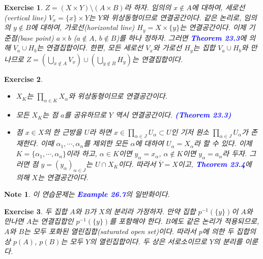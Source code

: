 \documentclass{article}
\newtheorem{exercise}{Exercise}[section]
\newtheorem*{note}{Note}
\begin{document}
\begin{exercise}
    $Z=(X\times Y)\setminus(A\times B)$라 하자. 임의의 $x\notin A$에 대하여, 세로선(vertical line) $V_x=\{x\}\times Y$는 $Y$와 위상동형이므로 연결공간이다. 같은 논리로, 임의의 $y\notin B$에 대하여, 가로선(horizontal line) $H_y=X\times \{y\}$는 연결공간이다. 이제 기준점(base point) $a\times b$ ($a\notin A$, $b\notin B$)를 하나 정하자. 그러면 \textcolor{blue}{\textbf{Theorem 23.3}}에 의해 $V_a\cup H_b$는 연결집합이다. 한편, 모든 세로선 $V_x$와 가로선 $H_y$는 집합 $V_a\cup H_b$와 만나므로 $Z=(\bigcup_{x\notin A}V_x)\cup(\bigcup_{y\notin B}H_y)$는 연결집합이다.
\end{exercise}

\begin{exercise}
	\label{exc:23.10}
    \phantom{}
    \begin{itemize}
        \item[(a)] $X_K$는 $\prod_{\alpha\in K}X_\alpha$와 위상동형이므로 연결공간이다.
        \item[(b)] 모든 $X_K$는 점 $a$를 공유하므로 $Y$ 역시 연결공간이다. \textcolor{blue}{\textbf{(Theorem 23.3)}}
        \item[(c)] 점 $x\in X$의 한 근방을 $U$라 하면 $x\in\prod_{\alpha\in J}U_\alpha\subset U$인 기저 원소 $\prod_{\alpha\in J}U_\alpha$가 존재한다. 이때 $\alpha_1,\cdots,\alpha_n$를 제외한 모든 $\alpha$에 대하여 $U_\alpha=X_\alpha$라 할 수 있다. 이제 $K=\{\alpha_1,\cdots,\alpha_n\}$이라 하고, $\alpha\in K$이면 $y_\alpha=x_\alpha$, $\alpha\notin K$이면 $y_\alpha=a_\alpha$라 두자. 그러면 점 $y=(y_\alpha)_{\alpha\in J}$는 $U\cap X_K$이다. 따라서 $\overline{Y}=X$이고, \textcolor{blue}{\textbf{Theorem 23.4}}에 의해 $X$는 연결공간이다.
    \end{itemize}
\end{exercise}
\begin{note}
    이 연습문제는 \textcolor{blue}{\textbf{Example 26.7}}의 일반화이다.
\end{note}

\begin{exercise}
    두 집합 $A$와 $B$가 $X$의 분리라 가정하자. 만약 집합 $p^{-1}(\{y\})$이 $A$와 만나면 $A$는 연결집합인 $p^{-1}(\{y\})$를 포함해야 한다. $B$에도 같은 논리가 적용되므로, $A$와 $B$는 모두 포화된 열린집합(saturated open set)이다. 따라서 $p$에 의한 두 집합의 상 $p(A)$, $p(B)$는 모두 $Y$의 열린집합이다. 두 상은 서로소이므로 $Y$의 분리를 이룬다. 
\end{exercise}
\end{document}
